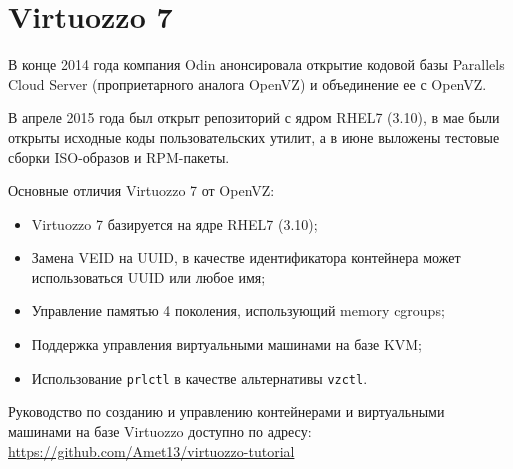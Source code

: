 \section{Virtuozzo 7}

В конце 2014 года компания Odin анонсировала открытие кодовой базы Parallels Cloud Server (проприетарного аналога OpenVZ) и объединение ее с OpenVZ.

В апреле 2015 года был открыт репозиторий с ядром RHEL7 (3.10), в мае были открыты исходные коды пользовательских утилит, а в июне выложены тестовые сборки ISO-образов и RPM-пакеты.

Основные отличия Virtuozzo 7 от OpenVZ:
\begin{itemize}
    \item Virtuozzo 7 базируется на ядре RHEL7 (3.10);
    \item Замена VEID на UUID, в качестве идентификатора контейнера может использоваться UUID или любое имя;
    \item Управление памятью 4 поколения, использующий memory cgroups;
    \item Поддержка управления виртуальными машинами на базе KVM;
    \item Использование \texttt{prlctl} в качестве альтернативы \texttt{vzctl}.
\end{itemize}

Руководство по созданию и управлению контейнерами и виртуальными машинами на базе Virtuozzo доступно по адресу: \url{https://github.com/Amet13/virtuozzo-tutorial}

\clearpage

